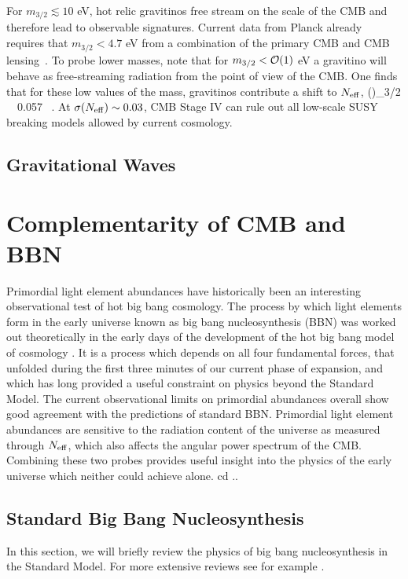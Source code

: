 For $m_{3/2} \lesssim 10$ eV, hot relic gravitinos free stream on the scale of the CMB and therefore lead to observable signatures.  Current data from Planck already requires that $m_{3/2} < 4.7$ eV from a combination of the primary CMB and CMB lensing~\cite{Osato:2016ixc}.  To probe lower masses, note that for $m_{3/2} < {\cal O}(1)$ eV a gravitino will behave as free-streaming radiation from the point of view of the CMB.  One finds that for these low values of the mass, gravitinos contribute a shift to $N_{\rm eff}$,
\beq
\left(\Delta \Neff\right)_{3/2} \, \gtrsim \, 0.057 \ .
\eeq
At $\sigma(N_{\rm eff}) \sim 0.03$, CMB Stage IV can rule out all low-scale SUSY breaking models allowed by current cosmology.  

\subsection{Gravitational Waves}

\section{Complementarity of CMB and BBN}


Primordial light element abundances have historically been an interesting observational test of hot big bang cosmology.  The process by which light elements form in the early universe known as big bang nucleosynthesis (BBN) was worked out theoretically in the early days of the development of the hot big bang model of cosmology \cite{Alpher:1948ve}.  It is a process which depends on all four fundamental forces, that unfolded during the first three minutes of our current phase of expansion, and which has long provided a useful constraint on physics beyond the Standard Model.  The current observational limits on primordial abundances overall show good agreement with the predictions of standard BBN.  Primordial light element abundances are sensitive to the radiation content of the universe as measured through $N_{\rm eff}$, which also affects the angular power spectrum of the CMB.  Combining these two probes provides useful insight into the physics of the early universe which neither could achieve alone.
cd ..
\subsection{Standard Big Bang Nucleosynthesis} \label{StandardBBN}
In this section, we will briefly review the physics of big bang nucleosynthesis in the Standard Model.  For more extensive reviews see for example \cite{Weinberg:2008zzc,Agashe:2014kda,Cyburt:2015mya}.

